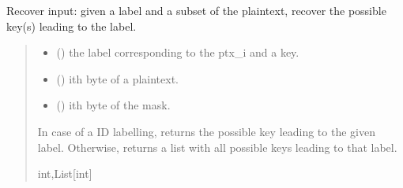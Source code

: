 \documentclass[letterpaper,10pt,english]{sphinxmanual}
\begin{document}
\begin{fulllineitems}
\begin{fulllineitems}
\end{fulllineitems}


\begin{fulllineitems}
\label{\detokenize{MLSCAlib.Ciphers:MLSCAlib.Ciphers.AES_leakage.AESLeakageModel.recover_input}}
\pysigstartsignatures
{}
\pysigstopsignatures
\sphinxAtStartPar
Recover input: given a label and a subset of the plaintext,
recover the possible key(s) leading to the label.
\begin{quote}\begin{description}
\begin{itemize}
\item {} 
\sphinxAtStartPar
{} () \textendash{} the label corresponding to the ptx\_i and a key.

\item {} 
\sphinxAtStartPar
{} () \textendash{} i\sphinxhyphen{}th byte of a plaintext.

\item {} 
\sphinxAtStartPar
{} (\sphinxstyleliteralemphasis{\sphinxupquote{, }}) \textendash{} i\sphinxhyphen{}th byte of the mask.

\end{itemize}

\sphinxAtStartPar
In case of a ID labelling, returns the possible key leading to the given label.
Otherwise, returns a list with all possible keys leading to that label.

\sphinxAtStartPar
int,List{[}int{]}

\end{description}\end{quote}

\end{fulllineitems}


\end{fulllineitems}
\end{document}
